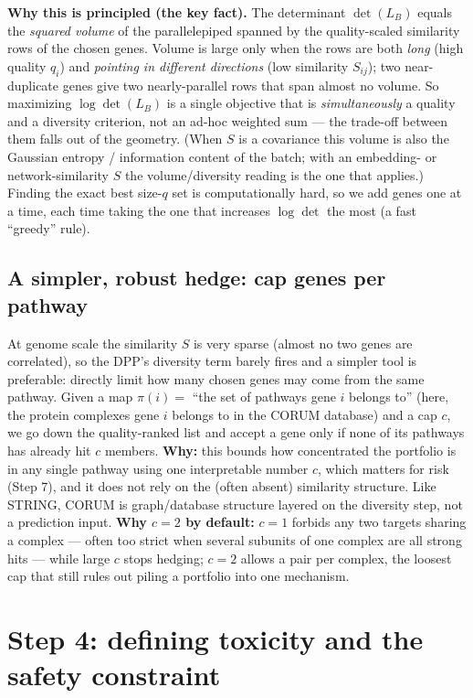 \documentclass[11pt]{article}
\begin{document}
\textbf{Why this is principled (the key fact).} The determinant $\det(L_B)$ equals the
\emph{squared volume} of the parallelepiped spanned by the quality-scaled similarity rows of
the chosen genes. Volume is large only when the rows are both \emph{long} (high quality
$q_i$) and \emph{pointing in different directions} (low similarity $S_{ij}$); two
near-duplicate genes give two nearly-parallel rows that span almost no volume. So
maximizing $\log\det(L_B)$ is a single objective that is \emph{simultaneously} a quality and
a diversity criterion, not an ad-hoc weighted sum --- the trade-off between them falls out
of the geometry. (When $S$ is a covariance this volume is also the Gaussian entropy /
information content of the batch; with an embedding- or network-similarity $S$ the
volume/diversity reading is the one that applies.) Finding the exact best size-$q$ set is
computationally hard, so we add genes one at a time, each time taking the one that increases
$\log\det$ the most (a fast ``greedy'' rule).

\subsection{A simpler, robust hedge: cap genes per pathway}

At genome scale the similarity $S$ is very sparse (almost no two genes are correlated), so
the DPP's diversity term barely fires and a simpler tool is preferable: directly limit how
many chosen genes may come from the same pathway. Given a map $\pi(i)=$ ``the set of
pathways gene $i$ belongs to'' (here, the protein complexes gene $i$ belongs to in the
CORUM database) and a cap $c$, we go down the quality-ranked list and accept
a gene only if none of its pathways has already hit $c$ members. \textbf{Why:} this bounds
how concentrated the portfolio is in any single pathway using one interpretable number
$c$, which matters for risk (Step 7), and it does not rely on the (often absent) similarity
structure. Like STRING, CORUM is graph/database structure layered on the diversity step,
not a prediction input. \textbf{Why $c{=}2$ by default:} $c{=}1$ forbids any two targets
sharing a complex --- often too strict when several subunits of one complex are all strong
hits --- while large $c$ stops hedging; $c{=}2$ allows a pair per complex, the loosest cap
that still rules out piling a portfolio into one mechanism.

\section{Step 4: defining toxicity and the safety constraint}
\end{document}
